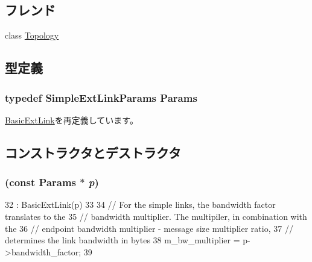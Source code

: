 \subsection*{フレンド}
\begin{DoxyCompactItemize}
\item 
class \hyperlink{classSimpleExtLink_acd2b8699ab7559c0da687cd775e2c778}{Topology}
\end{DoxyCompactItemize}


\subsection{型定義}
\hypertarget{classSimpleExtLink_a0653c80078cb239e9c7e87cfaead7ec9}{
\subsubsection[{Params}]{\setlength{\rightskip}{0pt plus 5cm}typedef SimpleExtLinkParams {\bf Params}}}
\label{classSimpleExtLink_a0653c80078cb239e9c7e87cfaead7ec9}


\hyperlink{classBasicExtLink_a124f6e2dedf13bd42661a62b7e155cee}{BasicExtLink}を再定義しています。

\subsection{コンストラクタとデストラクタ}
\hypertarget{classSimpleExtLink_ac89df5142e0bd6a7e66b018b2587f562}{
\subsubsection[{SimpleExtLink}]{ (const {\bf Params} $\ast$ {\em p})}}
\label{classSimpleExtLink_ac89df5142e0bd6a7e66b018b2587f562}



\begin{DoxyCode}
32     : BasicExtLink(p)
33 {
34     // For the simple links, the bandwidth factor translates to the
35     // bandwidth multiplier.  The multipiler, in combination with the 
36     // endpoint bandwidth multiplier - message size multiplier ratio, 
37     // determines the link bandwidth in bytes 
38     m_bw_multiplier = p->bandwidth_factor;
39 }
\end{DoxyCode}


